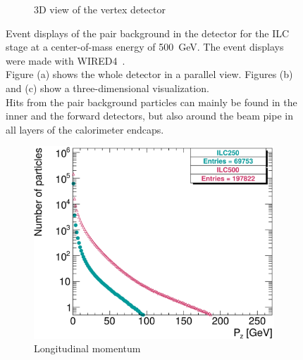 \begin{figure}[!h]
\begin{subfigure}[b]{0.43\textwidth}
   \caption{3D view of the vertex detector}
   \end{subfigure}
   \caption[Pair background event displays]{Event displays of the pair background in the 
   \sid detector for the ILC stage at a center-of-mass energy of \SI[detect-all]{500}{\GeV}. 
   The event displays were made with WIRED4~\cite{Wired4}.
   \\Figure (a) shows the whole \sid detector in a parallel view.
   Figures (b) and (c) show a three-dimensional visualization.
   \\Hits from the pair background particles can mainly be found in the inner and the forward detectors, but also around the beam pipe in all layers of the calorimeter endcaps.
   }
   \label{fig:PairBkg:wired4}
 \end{figure}

\begin{figure}[hpt]
 \centering
  \begin{subfigure}[b]{0.49\textwidth}
   \centering
    \includegraphics[width=0.99\textwidth]{Figures/Pairs/250_500_pairs_comparison_Pz.png}
   \caption{Longitudinal momentum}
   \end{subfigure}
   \hfill
    \begin{subfigure}[b]{0.49\textwidth}
   \centering

\end{subfigure}
\end{figure}
